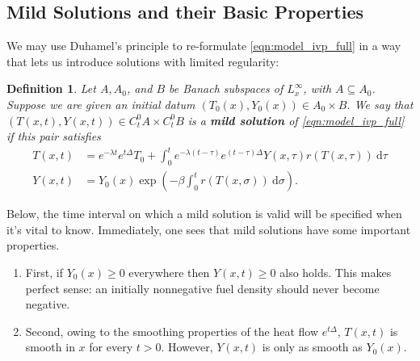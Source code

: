 \documentclass[twosided, 12pt]{article}
\numberwithin{equation}{section}
\theoremstyle{plain}
\newtheorem{defn}[thm]{Definition}
\newcommand{\diff}{\mathrm{d}}
\begin{document}
\subsection{Mild Solutions and their Basic Properties}
\noindent We may use Duhamel's principle to re-formulate \eqref{eqn:model_ivp_full} in a way that lets us introduce solutions with limited regularity: 
\begin{defn} Let $A, A_0$, and $B$ be Banach subspaces of $L^{\infty}_{x}$, with $A \subseteq A_0$. Suppose we are given an initial datum $\left(T_0(x), Y_0(x)\right)\in A_0 \times B$. We say that $\left(T(x,t), Y(x,t)\right)\in C^0_t A \times C^0_t B$ is a \textbf{mild solution} of \eqref{eqn:model_ivp_full} if this pair satisfies
\begin{subequations}\label{eqn:mild_soln}
\begin{align}
    T(x,t) &= e^{-\lambda t}e^{t\Delta}T_0 + \int_{0}^{t} e^{-\lambda\left(t-\tau\right)}e^{\left(t-\tau\right)\Delta} Y(x,\tau)r\left(T(x,\tau)\right) \ \diff \tau
    \\
    Y(x,t) &= Y_0(x) \exp\left(-\beta\int_0^t r\left(T(x,\sigma)\right) \ \diff \sigma\right). 
\end{align}
\end{subequations}
\end{defn}
\noindent Below, the time interval on which a mild solution is valid will be specified when it's vital to know. Immediately, one sees that mild solutions have some important properties. 
\par \noindent 
\begin{enumerate}
    \item First, if $Y_0(x)\geq 0$ everywhere then $Y(x,t)\geq 0$ also holds. This makes perfect sense: an initially nonnegative fuel density should never become negative. 
    \item Second, owing to the smoothing properties of the heat flow $e^{t\Delta}$, $T(x,t)$ is smooth in $x$ for every $t>0$. However, $Y(x,t)$ is only as smooth as $Y_0(x)$.
\end{enumerate}
\end{document}
